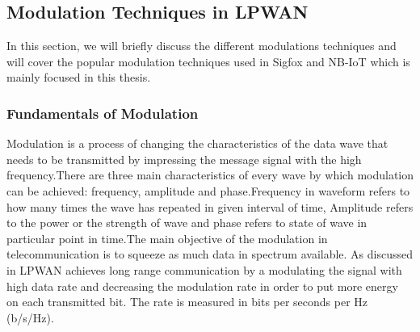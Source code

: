 \documentclass[12pt]{article}
\begin{document}

\subsection{Modulation Techniques in LPWAN }
In this section, we will briefly discuss the different modulations techniques and will cover the popular modulation techniques used in Sigfox and NB-IoT which is mainly focused in this thesis.
\subsubsection{Fundamentals of Modulation}
Modulation is a process of changing the characteristics of the data wave that needs to be transmitted by impressing the message signal with the high frequency.There are three main characteristics of every wave by which modulation can be achieved: frequency, amplitude and phase.Frequency in waveform refers to how many times the wave has repeated in given interval of time, Amplitude refers to the power or the strength of wave and phase refers to state of wave in particular point in time.The main objective of the modulation in telecommunication is to squeeze as much data in spectrum available. As discussed in \cite{raza2017low} LPWAN achieves long range communication by a modulating the signal with high data rate and decreasing the modulation rate in order to put more energy on each transmitted bit. The rate is measured in bits per seconds per Hz (b/s/Hz).
\end{document}
